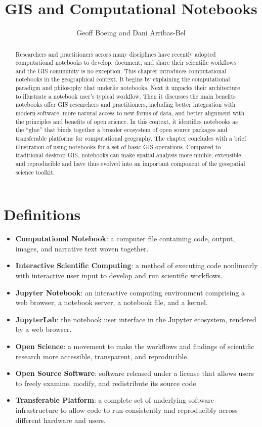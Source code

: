 \documentclass[11pt,letterpaper]{article}
\title{GIS and Computational Notebooks}
\author{Geoff Boeing and Dani Arribas-Bel}
\date{}
\begin{document}
\maketitle

\begin{abstract}
Researchers and practitioners across many disciplines have recently adopted computational notebooks to develop, document, and share their scientific workflows---and the GIS community is no exception. This chapter introduces computational notebooks in the geographical context. It begins by explaining the computational paradigm and philosophy that underlie notebooks. Next it unpacks their architecture to illustrate a notebook user's typical workflow. Then it discusses the main benefits notebooks offer GIS researchers and practitioners, including better integration with modern software, more natural access to new forms of data, and better alignment with the principles and benefits of open science. In this context, it identifies notebooks as the \enquote{glue} that binds together a broader ecosystem of open source packages and transferable platforms for computational geography. The chapter concludes with a brief illustration of using notebooks for a set of basic GIS operations. Compared to traditional desktop GIS, notebooks can make spatial analysis more nimble, extensible, and reproducible and have thus evolved into an important component of the geospatial science toolkit.
\end{abstract}

\section*{Definitions}

\begin{itemize}
    \item \textbf{Computational Notebook}: a computer file containing code, output, images, and narrative text woven together.
    \item \textbf{Interactive Scientific Computing}: a method of executing code nonlinearly with interactive user input to develop and run scientific workflows.
    \item \textbf{Jupyter Notebook}: an interactive computing environment comprising a web browser, a notebook server, a notebook file, and a kernel.
    \item \textbf{JupyterLab}: the notebook user interface in the Jupyter ecosystem, rendered by a web browser.
    \item \textbf{Open Science}: a movement to make the workflows and findings of scientific research more accessible, transparent, and reproducible.
    \item \textbf{Open Source Software}: software released under a license that allows users to freely examine, modify, and redistribute its source code.
    \item \textbf{Transferable Platform}: a complete set of underlying software infrastructure to allow code to run consistently and reproducibly across different hardware and users.
\end{itemize}
\end{document}
